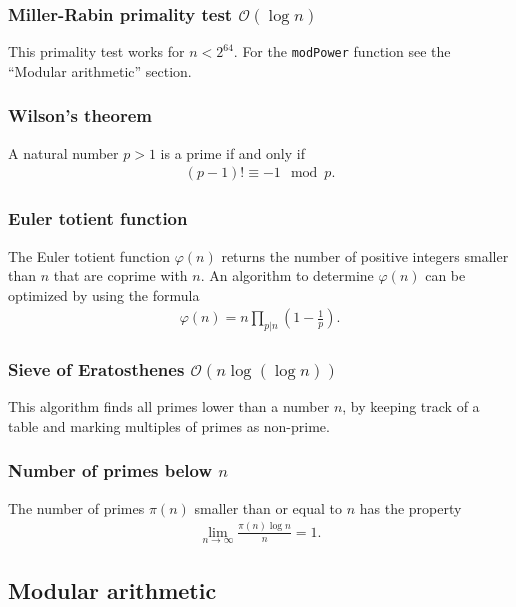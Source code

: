 \subsubsection{Miller-Rabin primality test $\mathcal O(\log n)$}
This primality test works for $n < 2^{64}$. For the \texttt{modPower} function see the ``Modular arithmetic'' section.

\subsubsection{Wilson's theorem}
A natural number $p > 1$ is a prime if and only if
\begin{align*}
    (p - 1)! \equiv -1 \mod p.
\end{align*}

\subsubsection{Euler totient function}
The Euler totient function $\varphi(n)$ returns the number of positive integers smaller than $n$ that are coprime with $n$. An algorithm to determine $\varphi(n)$ can be optimized by using the formula 
\begin{align*}
    \varphi(n) = n \prod_{p|n} \left(1 - \frac1p\right).
\end{align*}

\subsubsection{Sieve of Eratosthenes $\mathcal O(n\log(\log n))$}
This algorithm finds all primes lower than a number $n$, by keeping track of a table and marking multiples of primes as non-prime.

\subsubsection{Number of primes below $n$}
The number of primes $\pi(n)$ smaller than or equal to $n$ has the property
\begin{align*}
    \lim_{n \to \infty} \frac{\pi(n)\log n }{n} = 1.
\end{align*}



\subsection{Modular arithmetic}

